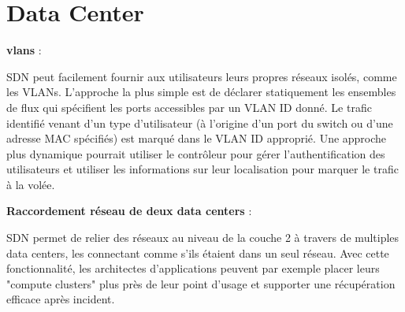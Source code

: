 \section{Data Center}

\textbf{\glspl{vlan}} :

SDN peut facilement fournir aux utilisateurs leurs propres réseaux isolés, comme les VLANs. L'approche la plus simple est de déclarer statiquement les ensembles de flux qui spécifient les ports accessibles par un VLAN ID donné. Le trafic identifié venant d'un type d'utilisateur (à l'origine d'un port du switch ou d'une adresse MAC spécifiés) est marqué dans le VLAN ID approprié. Une approche plus dynamique pourrait utiliser le contrôleur pour gérer l'authentification des utilisateurs et utiliser les informations sur leur localisation pour marquer le trafic à la volée. \cite{OpenFlowStanfordUsing} 







\textbf{Raccordement réseau de deux data centers} : 

SDN permet de relier des réseaux au niveau de la couche 2 à travers de multiples data centers, les connectant comme s'ils étaient dans un seul réseau. Avec cette fonctionnalité, les architectes d'applications peuvent par exemple placer leurs "compute clusters" plus près de leur point d'usage et supporter une récupération efficace après incident. \cite{ODCAusageScenarios}

